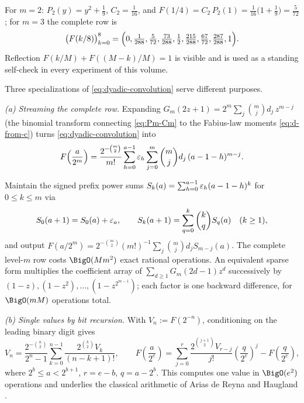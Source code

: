\begin{example}
For $m=2$: $P_2(y)=y^2+\tfrac19$, $C_2=\tfrac1{16}$, and
$F(1/4)=C_2\,P_2(1)=\tfrac1{16}\bigl(1+\tfrac19\bigr)
=\tfrac5{72}$; for $m=3$ the complete row is
\[
 \bigl(F(k/8)\bigr)_{k=0}^{8}
 =\Bigl(0,\tfrac1{288},\tfrac5{72},\tfrac{73}{288},\tfrac12,
 \tfrac{215}{288},\tfrac{67}{72},\tfrac{287}{288},1\Bigr).
\]
Reflection $F(k/M)+F((M-k)/M)=1$ is visible and is used as a standing
self-check in every experiment of this volume.
\end{example}

Three specializations of \eqref{eq:dyadic-convolution} serve different
purposes.

\emph{(a) Streaming the complete row.}  Expanding
$G_m(2z+1)=2^m\sum_{j}\binom mj d_j\,z^{m-j}$ (the binomial transform
connecting \eqref{eq:Pm-Cm} to the Fabius-law moments
\eqref{eq:d-from-c}) turns \eqref{eq:dyadic-convolution} into
\begin{equation}
 F\!\left(\frac{a}{2^{m}}\right)
 =\frac{2^{-\binom m2}}{m!}
 \sum_{h=0}^{a-1}\varepsilon_h
 \sum_{j=0}^{m}\binom mj d_j\,(a-1-h)^{m-j}.
 \label{eq:exact-dyadic-d}
\end{equation}

\begin{algorithm}
\label{alg:stream}
Maintain the signed prefix power sums
$S_k(a)=\sum_{h=0}^{a-1}\varepsilon_h(a-1-h)^k$ for $0\le k\le m$ via
\[
 S_0(a+1)=S_0(a)+\varepsilon_a,
 \qquad
 S_k(a+1)=\sum_{q=0}^{k}\binom kq S_q(a)\quad(k\ge1),
\]
and output
$F(a/2^m)=2^{-\binom m2}(m!)^{-1}\sum_j\binom mj d_j S_{m-j}(a)$.  The
complete level-$m$ row costs $\BigO(M m^2)$ exact rational operations.
An equivalent sparse form multiplies the coefficient array of
$\sum_{d\ge1}G_m(2d-1)z^d$ successively by
$(1-z),(1-z^2),\dots,(1-z^{2^{m-1}})$; each factor is one backward
difference, for $\BigO(mM)$ operations total.
\end{algorithm}

\emph{(b) Single values by bit recursion.}  With
$V_n:=F(2^{-n})$, conditioning on the leading binary digit gives
\begin{equation}
 V_n=\frac{2^{-\binom n2}}{2^{n}-1}
 \sum_{k=0}^{n-1}\frac{2^{\binom k2}V_k}{(n-k+1)!},
 \qquad
 F\!\left(\frac{a}{2^{e}}\right)
 =\sum_{j=0}^{r}\frac{2^{\binom{j+1}2}V_{r-j}}{j!}
 \left(\frac{q}{2^{e}}\right)^{j}
 -F\!\left(\frac{q}{2^{e}}\right),
 \label{eq:bit-recursion}
\end{equation}
where $2^{b}\le a<2^{b+1}$, $r=e-b$, $q=a-2^{b}$.  This computes one
value in $\BigO(e^2)$ operations and underlies the classical arithmetic
of Arias de Reyna and Haugland \cite{AriasArithmetic,Haugland2016}.


